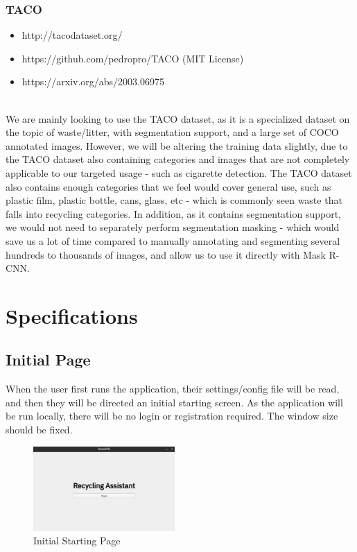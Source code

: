 \documentclass[conference]{IEEEtran}
\begin{document}
\subsubsection{TACO}
\begin{itemize}
\item http://tacodataset.org/
\item https://github.com/pedropro/TACO (MIT License)
\item https://arxiv.org/abs/2003.06975
\end{itemize}~\\
We are mainly looking to use the TACO dataset, as it is a specialized dataset on the topic of waste/litter, with segmentation support, and a large set of COCO annotated images. \newline
However, we will be altering the training data slightly, due to the TACO dataset also containing categories and images that are not completely applicable to our targeted usage - such as cigarette detection.
\newline\newline
The TACO dataset also contains enough categories that we feel would cover general use, such as plastic film, plastic bottle, cans, glass, etc - which is commonly seen waste that falls into recycling categories.
\newline
In addition, as it contains segmentation support, we would not need to separately perform segmentation masking - which would save us a lot of time compared to manually annotating and segmenting several hundreds to thousands of images, and allow us to use it directly with Mask R-CNN.

\newpage
\section{Specifications}
\subsection{Initial Page}
When the user first runs the application, their settings/config file will be read, and then they will be directed an initial starting screen. As the application will be run locally, there will be no login or registration required. The window size should be fixed. ~\\

\begin{figure}[h]
    \centering
    \includegraphics[width=0.48\textwidth]{images/start.eps}
    \caption{Initial Starting Page}
\end{figure}~\\
\end{document}
